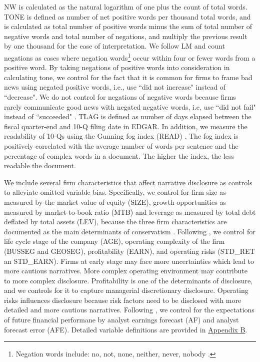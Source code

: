 \documentclass[letterpaper,12pt]{article}
\begin{document}
\begin{spacing}{1.5}
NW is calculated as the natural logarithm of one plus the count of total words. TONE is defined as number of net positive words per thousand total words, and is calculated as total number of positive words minus the sum of total number of negative words and total number of negations, and multiply the previous result by one thousand for the ease of interpretation. We follow LM and count negations as cases where negation words\footnote{Negation words include: no, not, none, neither, never, nobody \cite{tottieNegationEnglishSpeech1991}.} occur within four or fewer words from a positive word. By taking negations of positive words into consideration in calculating tone, we control for the fact that it is common for firms to frame bad news using negated positive words, i.e., use ``did not increase" instead of ``decrease". We do not control for negations of negative words because firms rarely communicate good news with negated negative words, i.e, use ``did not fail" instead of ``succeeded" \cite{loughranWhenLiabilityNot2011}. TLAG is defined as number of days elapsed between the fiscal quarter-end and 10-Q filing date in EDGAR. In addition, we measure the readability of 10-Qs using the Gunning fog index (READ) \cite{gunningTechniqueClearWriting1952, liAnnualReportReadability2008, loughranMeasuringReadabilityFinancial2014,  guayGuidingFogFinancial2016, loEarningsManagementAnnual2017, busheeLinguisticComplexityFirm2018}. The fog index is positively correlated with the average number of words per sentence and the percentage of complex words in a document. The higher the index, the less readable the document.

We include several firm characteristics that affect narrative disclosure as controls to alleviate omitted variable bias. Specifically, we control for firm size as measured by the market value of equity (SIZE), growth opportunities as measured by market-to-book ratio (MTB) and leverage as measured by total debt deflated by total assets (LEV), because the three firm characteristics are documented as the main determinants of conservatism \cite{wattsConservatismAccountingPart2003, qiangEffectsContractingLitigation2007, khanEstimationEmpiricalProperties2009, laraEconomicDeterminantsConditional2009}. Following , we control for life cycle stage of the company (AGE), operating complexity of the firm (BUSSEG and GEOSEG), profitability (EARN), and operating risks (STD\_RET an STD\_EARN). Firms at early stage may face more uncertainties which lead to more cautious narratives. More complex operating environment may contribute to more complex disclosure. Profitability is one of the determinants of disclosure, and we controls for it to capture managerial discretionary disclosure. Operating risks influences disclosure because risk factors need to be disclosed with more detailed and more cautious narratives. Following , we control for the expectations of future financial performane by analyst earnings forecast (AF) and analyst forecast error (AFE). Detailed variable definitions are provided in \hyperref[appb]{Appendix B}.


\end{spacing}
\end{document}
